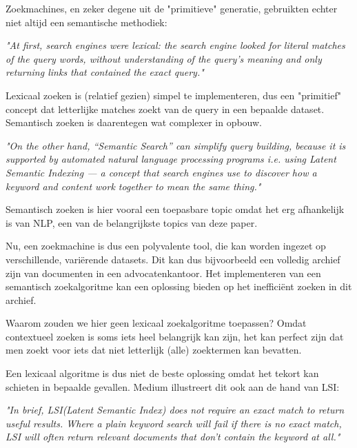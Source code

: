 Zoekmachines, en zeker degene uit de "primitieve" generatie, gebruikten echter niet altijd een semantische methodiek:

\begin{displayquote}
	\textit{"At first, search engines were lexical: the search engine looked for literal matches of the query words,
		without understanding of the query’s meaning and only returning links that contained the exact query."} \autocite{MediumSemanticSearch}
\end{displayquote}

Lexicaal zoeken is (relatief gezien) simpel te implementeren, dus een "primitief" concept dat letterlijke matches zoekt van de query in een bepaalde dataset.
Semantisch zoeken is daarentegen wat complexer in opbouw.

\begin{displayquote}
	\textit{"On the other hand, “Semantic Search” can simplify query building, because it is supported by automated natural language processing programs
		i.e. using Latent Semantic Indexing — a concept that search engines use to discover how a keyword and content work together to mean the same thing."} \autocite{MediumSemanticSearch}
\end{displayquote}

Semantisch zoeken is hier vooral een toepasbare topic omdat het erg afhankelijk is van NLP, een van de belangrijkste topics van deze paper.

Nu, een zoekmachine is dus een polyvalente tool, die kan worden ingezet op verschillende, variërende datasets.
Dit kan dus bijvoorbeeld een volledig archief zijn van documenten in een advocatenkantoor.
Het implementeren van een semantisch zoekalgoritme kan een oplossing bieden op het inefficiënt zoeken in dit archief.

Waarom zouden we hier geen lexicaal zoekalgoritme toepassen?
Omdat contextueel zoeken is soms iets heel belangrijk kan zijn, het kan perfect zijn dat men zoekt voor iets dat niet letterlijk (alle) zoektermen kan bevatten.

Een lexicaal algoritme is dus niet de beste oplossing omdat het tekort kan schieten in bepaalde gevallen. Medium illustreert dit ook aan de hand van LSI:

\begin{displayquote}
	\textit{"In brief, LSI(Latent Semantic Index) does not require an exact match to return useful results.
		Where a plain keyword search will fail if there is no exact match,
		LSI will often return relevant documents that don’t contain the keyword at all." }\autocite{MediumSemanticSearch}
\end{displayquote}

